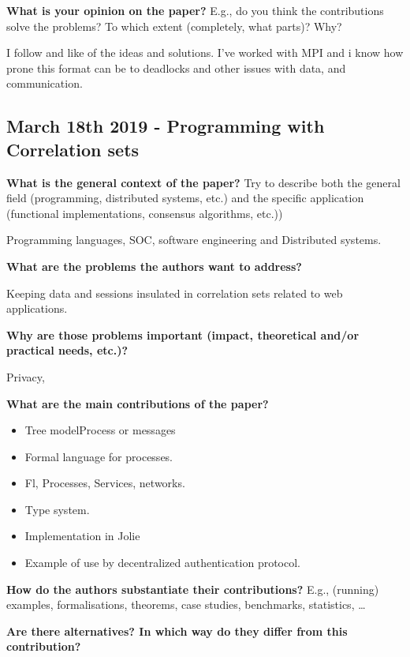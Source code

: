 \documentclass[a4paper,10pt,titlepage]{report}
\begin{document}
\textbf{\itemTitle What is your opinion on the paper?} E.g., do you think the
contributions solve the problems? To which extent (completely, what parts)?
Why?

I follow and like of the ideas and solutions. I've worked with MPI and i know how prone this format can be to deadlocks and other issues with data, and communication.


\subsection{March 18th 2019 - Programming with Correlation sets}

\textbf{\itemTitle What is the general context of the paper?} 
Try to describe both the general field (programming, distributed systems,
etc.) and the specific application (functional implementations, consensus
algorithms, etc.))

Programming languages, SOC, software engineering and Distributed systems.


\textbf{\itemTitle What are the problems the authors want to address?}

Keeping data and sessions insulated in correlation sets related to web applications.


\textbf{\itemTitle Why are those problems important (impact, theoretical
and/or practical needs, etc.)?}

Privacy, 


\textbf{\itemTitle What are the main contributions of the paper?}

\begin{itemize}
\item Tree model{Process or messages}
\item Formal language for processes.
\item Fl, Processes, Services,  networks.
\item Type system.
\item Implementation in Jolie
\item Example of use by decentralized authentication protocol.
\end{itemize}

\textbf{\itemTitle How do the authors substantiate their contributions?} E.g., 
(running) examples, formalisations, theorems, case studies, benchmarks,
statistics, \dots

\stdLines

\textbf{\itemTitle Are there alternatives? In which way do they differ from this
contribution?}
\end{document}
